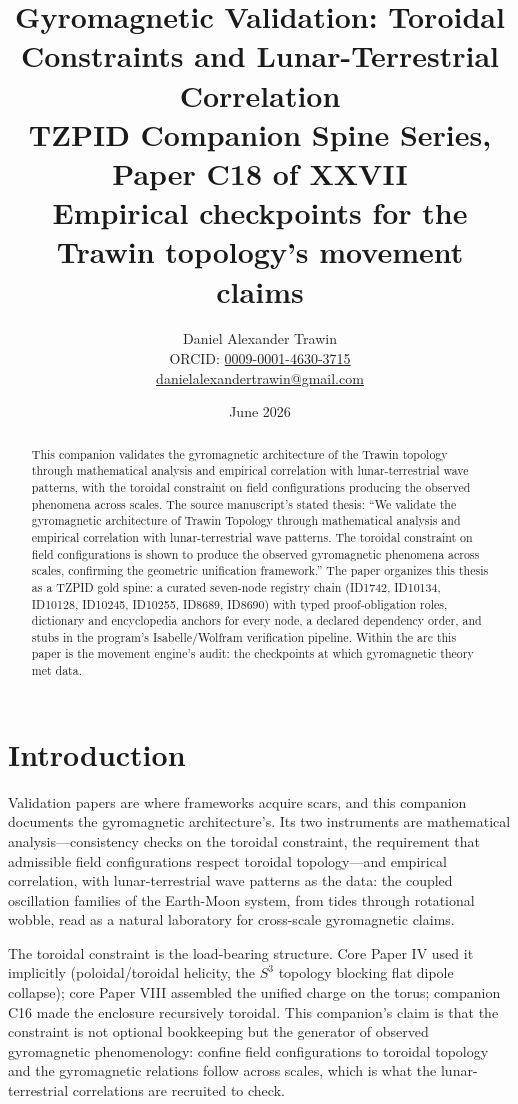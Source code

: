 \documentclass[11pt]{article}
\title{Gyromagnetic Validation: Toroidal Constraints and Lunar-Terrestrial Correlation\\[0.6em]
\large TZPID Companion Spine Series, Paper C18 of XXVII\\
\normalsize Empirical checkpoints for the Trawin topology's movement claims}
\author{Daniel Alexander Trawin\\
\small ORCID: \href{https://orcid.org/0009-0001-4630-3715}{0009-0001-4630-3715}\\
\small \href{mailto:danielalexandertrawin@gmail.com}{danielalexandertrawin@gmail.com}}
\date{June 2026}
\theoremstyle{remark}
\begin{document}
\maketitle

\begin{abstract}
This companion validates the gyromagnetic architecture of the Trawin topology through mathematical analysis and empirical correlation with lunar-terrestrial wave patterns, with the toroidal constraint on field configurations producing the observed phenomena across scales.
The source manuscript's stated thesis: ``We validate the gyromagnetic architecture of Trawin Topology through mathematical analysis and empirical correlation with lunar-terrestrial wave patterns. The toroidal constraint on field configurations is shown to produce the observed gyromagnetic phenomena across scales, confirming the geometric unification framework.'' The paper organizes this thesis as a TZPID gold spine: a curated seven-node registry chain (ID1742, ID10134, ID10128, ID10245, ID10255, ID8689, ID8690) with typed proof-obligation roles, dictionary and encyclopedia anchors for every node, a declared dependency order, and stubs in the program's Isabelle/Wolfram verification pipeline. Within the arc this paper is the movement engine's audit: the checkpoints at which gyromagnetic theory met data.
\end{abstract}

\section{Introduction}
\label{sec:intro}

Validation papers are where frameworks acquire scars, and this companion documents the gyromagnetic architecture's. Its two instruments are mathematical analysis---consistency checks on the toroidal constraint, the requirement that admissible field configurations respect toroidal topology---and empirical correlation, with lunar-terrestrial wave patterns as the data: the coupled oscillation families of the Earth-Moon system, from tides through rotational wobble, read as a natural laboratory for cross-scale gyromagnetic claims.

The toroidal constraint is the load-bearing structure. Core Paper IV used it implicitly (poloidal/toroidal helicity, the $S^3$ topology blocking flat dipole collapse); core Paper VIII assembled the unified charge on the torus; companion C16 made the enclosure recursively toroidal. This companion's claim is that the constraint is not optional bookkeeping but the generator of observed gyromagnetic phenomenology: confine field configurations to toroidal topology and the gyromagnetic relations follow across scales, which is what the lunar-terrestrial correlations are recruited to check.
\end{document}
